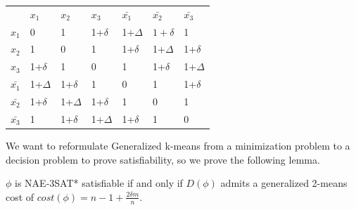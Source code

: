 \begin{table}[H]
\begin{tabular}{lllllll}
                       & $x_1$                      & $x_2 $                     & $x_3 $                    & $\bar{x_1}$                      & $\bar{x_2}$                      & $\bar{x_3}$                     \\ \cline{2-7} 
\multicolumn{1}{l|}{$x_1$} & \multicolumn{1}{l|}{0} & \multicolumn{1}{l|}{1}  & \multicolumn{1}{l|}{1+$\delta$}  & \multicolumn{1}{l|}{1+$\Delta$}  & \multicolumn{1}{l|}{$1+\delta$}  & \multicolumn{1}{l|}{1}  \\ \cline{2-7} 
\multicolumn{1}{l|}{$x_2$} & \multicolumn{1}{l|}{1}  & \multicolumn{1}{l|}{0} & \multicolumn{1}{l|}{1}  & \multicolumn{1}{l|}{1+$\delta$}  & \multicolumn{1}{l|}{1+$\Delta$}  & \multicolumn{1}{l|}{1+$\delta$}  \\ \cline{2-7} 
\multicolumn{1}{l|}{$x_3$} & \multicolumn{1}{l|}{1+$\delta$}  & \multicolumn{1}{l|}{1}  & \multicolumn{1}{l|}{0} & \multicolumn{1}{l|}{1}  & \multicolumn{1}{l|}{1+$\delta$}  & \multicolumn{1}{l|}{1+$\Delta$}  \\ \cline{2-7} 
\multicolumn{1}{l|}{$\bar{x_1}$} & \multicolumn{1}{l|}{1+$\Delta$}  & \multicolumn{1}{l|}{1+$\delta$}  & \multicolumn{1}{l|}{1}  & \multicolumn{1}{l|}{0} & \multicolumn{1}{l|}{1}  & \multicolumn{1}{l|}{1+$\delta$}  \\ \cline{2-7} 
\multicolumn{1}{l|}{$\bar{x_2}$} & \multicolumn{1}{l|}{1+$\delta$}  & \multicolumn{1}{l|}{1+$\Delta$}  & \multicolumn{1}{l|}{1+$\delta$}  & \multicolumn{1}{l|}{1}  & \multicolumn{1}{l|}{0} & \multicolumn{1}{l|}{1}  \\ \cline{2-7} 
\multicolumn{1}{l|}{$\bar{x_3}$} & \multicolumn{1}{l|}{1}  & \multicolumn{1}{l|}{1+$\delta$}  & \multicolumn{1}{l|}{1+$\Delta$}  & \multicolumn{1}{l|}{1+$\delta$}  & \multicolumn{1}{l|}{1}  & \multicolumn{1}{l|}{0} \\ \cline{2-7} 

\end{tabular}

\end {table}

We want to reformulate Generalized k-means from a minimization problem to a decision problem to prove satisfiability, so we prove the following lemma.
\begin{lemma} \label{generalized-2-means-cost}
$\phi$ is NAE-3SAT* satisfiable if and only if $D(\phi)$ admits a
generalized 2-means cost of $cost(\phi) = n - 1 + \frac{2\delta
  m}{n}$. 
\end{lemma}

